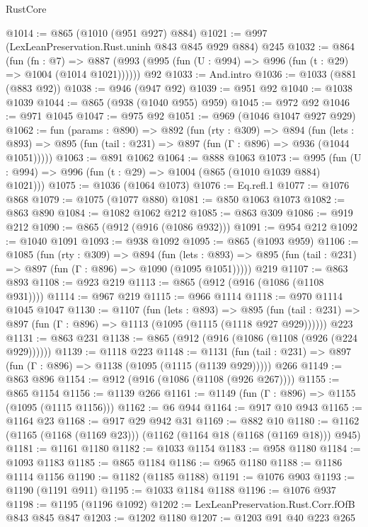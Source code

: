\begin{lexlean}{RustCore}
\begin{coremodule}
{\begin{coremodule}
{{{{{{{{@1014 := @865 (@1010 (@951 @927) @884)
@1021 := @997 (LexLeanPreservation.Rust.uninh @843 @845 @929 @884) @245
@1032 := @864
    (fun (fn : @7) =>
    @887 (@993 (@995 (fun (U : @994) => @996 (fun (t : @29) => @1004 (@1014 @1021))))))
    @92
@1033 := And.intro
@1036 := @1033 (@881 (@883 @92))
@1038 := @946 (@947 @92)
@1039 := @951 @92
@1040 := @1038 @1039
@1044 := @865 (@938 (@1040 @955) @959)
@1045 := @972 @92
@1046 := @971 @1045
@1047 := @975 @92
@1051 := @969 (@1046 @1047 @927 @929)
@1062 := fun (params : @890) =>
  @892
    (fun (rty : @309) =>
    @894
      (fun (lets : @893) =>
      @895 (fun (tail : @231) => @897 (fun (Γ : @896) => @936 (@1044 @1051)))))
@1063 := @891 @1062
@1064 := @888 @1063
@1073 := @995 (fun (U : @994) => @996 (fun (t : @29) => @1004 (@865 (@1010 @1039 @884) @1021)))
@1075 := @1036 (@1064 @1073)
@1076 := Eq.refl.{1}
@1077 := @1076 @868
@1079 := @1075 (@1077 @880)
@1081 := @850 @1063 @1073
@1082 := @863 @890
@1084 := @1082 @1062 @212
@1085 := @863 @309
@1086 := @919 @212
@1090 := @865 (@912 (@916 (@1086 @932)))
@1091 := @954 @212
@1092 := @1040 @1091
@1093 := @938 @1092
@1095 := @865 (@1093 @959)
@1106 := @1085
    (fun (rty : @309) =>
    @894
      (fun (lets : @893) =>
      @895 (fun (tail : @231) => @897 (fun (Γ : @896) => @1090 (@1095 @1051)))))
    @219
@1107 := @863 @893
@1108 := @923 @219
@1113 := @865 (@912 (@916 (@1086 (@1108 @931))))
@1114 := @967 @219
@1115 := @966 @1114
@1118 := @970 @1114 @1045 @1047
@1130 := @1107
    (fun (lets : @893) =>
    @895 (fun (tail : @231) => @897 (fun (Γ : @896) => @1113 (@1095 (@1115 (@1118 @927 @929))))))
    @223
@1131 := @863 @231
@1138 := @865 (@912 (@916 (@1086 (@1108 (@926 (@224 @929))))))
@1139 := @1118 @223
@1148 := @1131
    (fun (tail : @231) => @897 (fun (Γ : @896) => @1138 (@1095 (@1115 (@1139 @929)))))
    @266
@1149 := @863 @896
@1154 := @912 (@916 (@1086 (@1108 (@926 @267))))
@1155 := @865 @1154
@1156 := @1139 @266
@1161 := @1149 (fun (Γ : @896) => @1155 (@1095 (@1115 @1156)))
@1162 := @6 @944
@1164 := @917 @10 @943
@1165 := @1164 @23
@1168 := @917 @29 @942 @31
@1169 := @882 @10
@1180 := @1162 (@1165 (@1168 (@1169 @23))) (@1162 (@1164 @18 (@1168 (@1169 @18))) @945)
@1181 := @1161 @1180
@1182 := @1033 @1154
@1183 := @958 @1180
@1184 := @1093 @1183
@1185 := @865 @1184
@1186 := @965 @1180
@1188 := @1186 @1114 @1156
@1190 := @1182 (@1185 @1188)
@1191 := @1076 @903
@1193 := @1190 (@1191 @911)
@1195 := @1033 @1184 @1188
@1196 := @1076 @937
@1198 := @1195 (@1196 @1092)
@1202 := LexLeanPreservation.Rust.Corr.fOfB @843 @845 @847
@1203 := @1202 @1180
@1207 := @1203 @91 @40 @223 @265
}}}}}}}}
\end{coremodule}}
\end{coremodule}
\end{lexlean}
